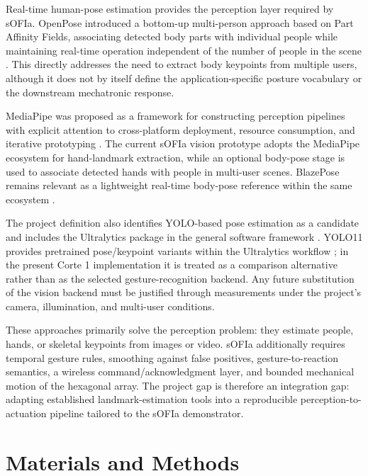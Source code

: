 \documentclass[lettersize,journal]{IEEEtran}
\begin{document}
Real-time human-pose estimation provides the perception layer required by sOFIa. OpenPose introduced a bottom-up multi-person approach based on Part Affinity Fields, associating detected body parts with individual people while maintaining real-time operation independent of the number of people in the scene \cite{cao2017openpose}. This directly addresses the need to extract body keypoints from multiple users, although it does not by itself define the application-specific posture vocabulary or the downstream mechatronic response.

MediaPipe was proposed as a framework for constructing perception pipelines with explicit attention to cross-platform deployment, resource consumption, and iterative prototyping \cite{lugaresi2019mediapipe}. The current sOFIa vision prototype adopts the MediaPipe ecosystem for hand-landmark extraction, while an optional body-pose stage is used to associate detected hands with people in multi-user scenes. BlazePose remains relevant as a lightweight real-time body-pose reference within the same ecosystem \cite{bazarevsky2020blazepose}.

The project definition also identifies YOLO-based pose estimation as a candidate and includes the Ultralytics package in the general software framework \cite{labdst2026sc}. YOLO11 provides pretrained pose/keypoint variants within the Ultralytics workflow \cite{jocher2024yolo11}; in the present Corte 1 implementation it is treated as a comparison alternative rather than as the selected gesture-recognition backend. Any future substitution of the vision backend must be justified through measurements under the project's camera, illumination, and multi-user conditions.

These approaches primarily solve the perception problem: they estimate people, hands, or skeletal keypoints from images or video. sOFIa additionally requires temporal gesture rules, smoothing against false positives, gesture-to-reaction semantics, a wireless command/acknowledgment layer, and bounded mechanical motion of the hexagonal array. The project gap is therefore an integration gap: adapting established landmark-estimation tools into a reproducible perception-to-actuation pipeline tailored to the sOFIa demonstrator.

\section{Materials and Methods}
\label{sec:methods}
\end{document}
